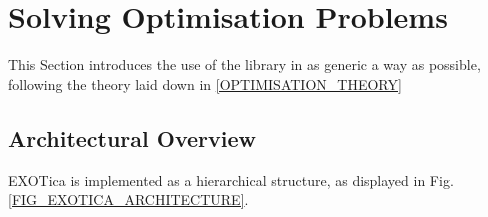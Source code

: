 \documentclass[12pt,a4paper,onecolumn]{article}
\begin{document}
%
%


\newpage
\section{Solving Optimisation Problems}
\label{USING_THE_LIBRARY}
This Section introduces the use of the library in as generic a way as possible, following the theory laid down in \ref{OPTIMISATION_THEORY}

\subsection{Architectural Overview}
EXOTica is implemented as a hierarchical structure, as displayed in Fig.\ref{FIG_EXOTICA_ARCHITECTURE}. 
\end{document}
